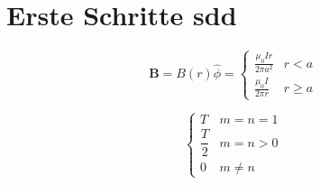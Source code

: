 \section{Erste Schritte  sdd} 


\begin{equation*}
\mathbf{B}=B(r) \hat{\phi}=\left\{\begin{array}{ll}{\frac{\mu_{0} I r}{2 \pi a^{2}}} & {r<a} \\ {\frac{\mu_{0} I}{2 \pi r}} & {r \geq a}\end{array}\right.
\end{equation*}


\begin{equation*}
\begin{cases}
{T} & {m=n=1} \\[1.0em]
{\dfrac{T}{2}} & {m=n>0} \\[1.0em]
{0} & {m \neq n}
\end{cases}
\end{equation*}